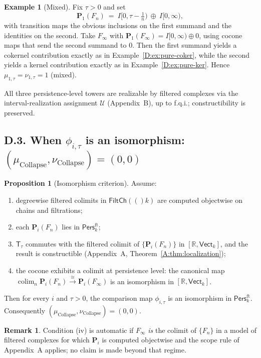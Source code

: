 \documentclass[11pt]{article}
\numberwithin{equation}{section}
\theoremstyle{plain}
\theoremstyle{definition}
\theoremstyle{remark}
\DeclareMathOperator{\colim}{colim}
\newcommand{\RR}{\mathbb{R}}
\newcommand{\Pers}{\mathsf{Pers}}
\newcommand{\Vect}{\mathsf{Vect}}
\newcommand{\T}{\mathsf{T}}
\theoremstyle{plain}
\theoremstyle{definition}
\numberwithin{equation}{section}
\newtheorem{proposition}[theorem]{Proposition}
\theoremstyle{definition}
\newtheorem{example}[theorem]{Example}
\newtheorem{remark}[theorem]{Remark}
\DeclareRobustCommand{\FiltCh}[1]{\mathsf{FiltCh}(#1)}
\DeclareRobustCommand{\muc}{\mu_{\mathrm{Collapse}}}
\DeclareRobustCommand{\nuc}{\nu_{\mathrm{Collapse}}}
\numberwithin{equation}{section}
\theoremstyle{plain}
\theoremstyle{definition}
\theoremstyle{remark}
\newcommand{\Pfun}{\mathbf{P}}
\newcommand{\Ufun}{\mathcal{U}}
\providecommand{\muc}{\mu_{\mathrm{Collapse}}}
\providecommand{\nuc}{\nu_{\mathrm{Collapse}}}
\begin{document}
\begin{example}[Mixed]\label{D:ex:mixed}
Fix \(\tau>0\) and set
\[
\Pfun_1(F_n)\ =\ I[0,\tau-\tfrac1n)\ \oplus\ I[0,\infty),
\]
with transition maps the obvious inclusions on the first summand and the identities on the second.
Take \(F_\infty\) with \(\Pfun_1(F_\infty)=I[0,\infty)\oplus 0\), using cocone maps that send the second summand to \(0\).
Then the first summand yields a cokernel contribution exactly as in Example~\ref{D:ex:pure-coker}, while the second yields a kernel contribution exactly as in Example~\ref{D:ex:pure-ker}.
Hence \(\mu_{1,\tau}=\nu_{1,\tau}=1\) (mixed).
\end{example}

All three persistence-level towers are realizable by filtered complexes via the interval-realization assignment \(\Ufun\) (Appendix~B), up to f.q.i.; constructibility is preserved.

\subsection*{D.3. When \texorpdfstring{$\phi_{i,\tau}$}{phi} is an isomorphism: \texorpdfstring{$(\muc,\nuc)=(0,0)$}{(mu,nu)=(0,0)}}

\begin{proposition}[Isomorphism criterion]\label{D:prop:iso-zero}
Assume:
\begin{enumerate}[label=(\roman*)]
\item degreewise filtered colimits in \(\FiltCh(k)\) are computed objectwise on chains and filtrations;
\item each \(\Pfun_i(F_n)\) lies in \(\Pers^{\mathrm{ft}}_k\);
\item \(\T_\tau\) commutes with the filtered colimit of \(\{\Pfun_i(F_n)\}\) in \([\RR,\Vect_k]\), and the result is constructible (Appendix~A, Theorem~\ref{A:thm:localization});
\item the cocone exhibits a colimit at persistence level: the canonical map
\(\colim_{n}\Pfun_i(F_n)\xrightarrow{\ \cong\ }\Pfun_i(F_\infty)\)
is an isomorphism in \([\RR,\Vect_k]\).
\end{enumerate}
Then for every \(i\) and \(\tau>0\), the comparison map \(\phi_{i,\tau}\) is an isomorphism in \(\Pers^{\mathrm{ft}}_k\).
Consequently \((\muc,\nuc)=(0,0)\).
\end{proposition}

\begin{remark}
Condition (iv) is automatic if \(F_\infty\) \emph{is} the colimit of \(\{F_n\}\) in a model of filtered complexes for which \(\Pfun_i\) is computed objectwise and the scope rule of Appendix~A applies; no claim is made beyond that regime.
\end{remark}
\end{document}
